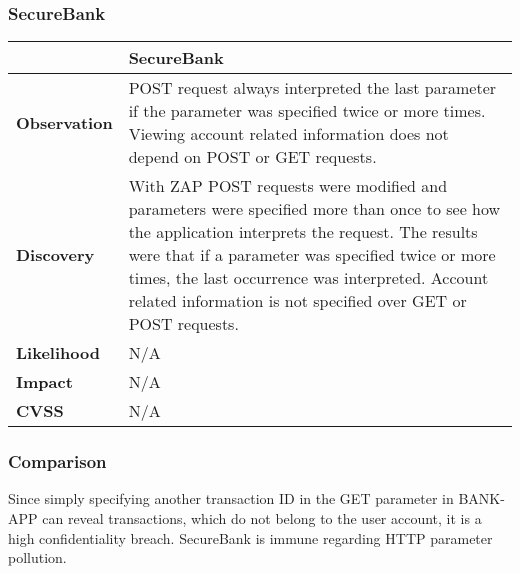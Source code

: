 \subsubsection{SecureBank}
\begin{tabular*}{\textwidth}{ p{} | p{} }\hline
    & \textbf{SecureBank} \\ \hline
    \textbf{Observation} & POST request always interpreted the last parameter if the parameter was specified twice or more times. Viewing account related information does not depend on POST or GET requests. \\
    \textbf{Discovery} & With ZAP POST requests were modified and parameters were specified more than once to see how the application interprets the request. The results were that if a parameter was specified twice or more times, the last occurrence was interpreted. Account related information is not specified over GET or POST requests. \\
    \textbf{Likelihood} & N/A \\
    \textbf{Impact} & N/A \\
    \textbf{CVSS} & N/A \\ \hline
\end{tabular*}

\subsubsection{Comparison}
Since simply specifying another transaction ID in the GET parameter in BANK-APP can reveal transactions, which do not belong to the user account, it is a high confidentiality breach. SecureBank is immune regarding HTTP parameter pollution.
\clearpage